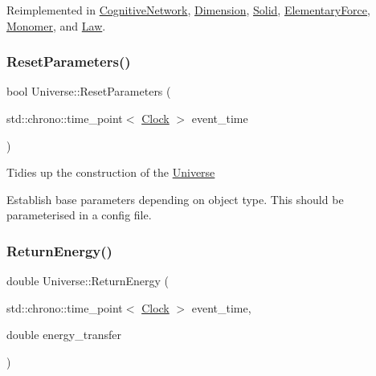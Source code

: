 Reimplemented in \mbox{\hyperlink{classCognitiveNetwork_ac97c08a0af7dc0d02fbe059827b6be87}{Cognitive\+Network}}, \mbox{\hyperlink{classDimension_a5b07f5c8558233c8f3488baf1fe3459a}{Dimension}}, \mbox{\hyperlink{classSolid_ae2a486e59f11f96a1a39756b3f3da53f}{Solid}}, \mbox{\hyperlink{classElementaryForce_aa5ab479744dbf3e8578f8d2974299ff7}{Elementary\+Force}}, \mbox{\hyperlink{classMonomer_a5b2375df1e19abdf6045c475d2ac23ca}{Monomer}}, and \mbox{\hyperlink{classLaw_af99520c95b2cd8af0af110b78b2288ef}{Law}}.

\mbox{\label{classUniverse_a1d92b2277564577571c802f6e0c206dd}} 
\subsubsection{\texorpdfstring{Reset\+Parameters()}{ResetParameters()}}
{\footnotesize\ttfamily bool Universe\+::\+Reset\+Parameters (\begin{DoxyParamCaption}\item[{std\+::chrono\+::time\+\_\+point$<$ \mbox{\hyperlink{universe_8h_a0ef8d951d1ca5ab3cfaf7ab4c7a6fd80}{Clock}} $>$}]{event\+\_\+time }\end{DoxyParamCaption})}

Tidies up the construction of the \mbox{\hyperlink{classUniverse}{Universe}}

Establish base parameters depending on object type. This should be parameterised in a config file.\mbox{\label{classUniverse_aeda74e3902c0e56c0c09779854045cde}} 
\subsubsection{\texorpdfstring{Return\+Energy()}{ReturnEnergy()}}
{\footnotesize\ttfamily double Universe\+::\+Return\+Energy (\begin{DoxyParamCaption}\item[{std\+::chrono\+::time\+\_\+point$<$ \mbox{\hyperlink{universe_8h_a0ef8d951d1ca5ab3cfaf7ab4c7a6fd80}{Clock}} $>$}]{event\+\_\+time,  }\item[{double}]{energy\+\_\+transfer }\end{DoxyParamCaption})}

